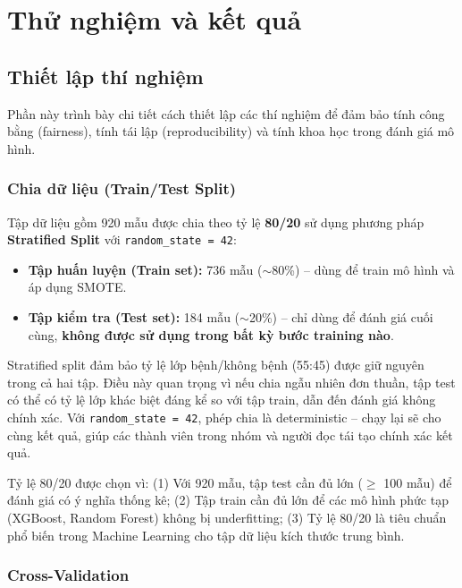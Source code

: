 \chapter{Thử nghiệm và kết quả}\label{chapter_experiment}

\section{Thiết lập thí nghiệm}

Phần này trình bày chi tiết cách thiết lập các thí nghiệm để đảm bảo tính công bằng (fairness), tính tái lập (reproducibility) và tính khoa học trong đánh giá mô hình.

\subsection{Chia dữ liệu (Train/Test Split)}

Tập dữ liệu gồm 920 mẫu được chia theo tỷ lệ \textbf{80/20} sử dụng phương pháp \textbf{Stratified Split} với \texttt{random\_state = 42}:
\begin{itemize}
    \item \textbf{Tập huấn luyện (Train set):} 736 mẫu ($\sim$80\%) -- dùng để train mô hình và áp dụng SMOTE.
    \item \textbf{Tập kiểm tra (Test set):} 184 mẫu ($\sim$20\%) -- chỉ dùng để đánh giá cuối cùng, \textbf{không được sử dụng trong bất kỳ bước training nào}.
\end{itemize}

Stratified split đảm bảo tỷ lệ lớp bệnh/không bệnh (55:45) được giữ nguyên trong cả hai tập. Điều này quan trọng vì nếu chia ngẫu nhiên đơn thuần, tập test có thể có tỷ lệ lớp khác biệt đáng kể so với tập train, dẫn đến đánh giá không chính xác. Với \texttt{random\_state = 42}, phép chia là deterministic -- chạy lại sẽ cho cùng kết quả, giúp các thành viên trong nhóm và người đọc tái tạo chính xác kết quả.

Tỷ lệ 80/20 được chọn vì: (1) Với 920 mẫu, tập test cần đủ lớn ($\geq$ 100 mẫu) để đánh giá có ý nghĩa thống kê; (2) Tập train cần đủ lớn để các mô hình phức tạp (XGBoost, Random Forest) không bị underfitting; (3) Tỷ lệ 80/20 là tiêu chuẩn phổ biến trong Machine Learning cho tập dữ liệu kích thước trung bình.

\subsection{Cross-Validation}

